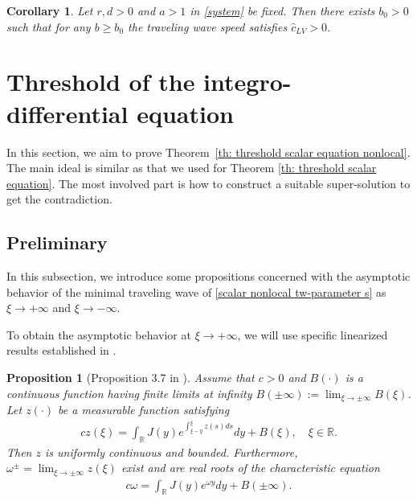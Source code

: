 \documentclass[11pt,a4paper]{article}
\newtheorem{proposition}[theorem]{\textbf{Proposition}}
\newtheorem{corollary}[theorem]{\textbf{Corollary}}
\numberwithin{equation}{section}
\numberwithin{figure}{section}
\newcommand\bea{\begin{eqnarray}}
\newcommand\eea{\end{eqnarray}}
\newcommand\beaa{\begin{eqnarray*}}
\newcommand\eeaa{\end{eqnarray*}}
\begin{document}
\begin{corollary}\label{cor: application 2}
Let $r,d>0$ and $a>1$ in \eqref{system} be fixed. Then there exists $b_0>0$ such that for any $b\ge b_0$ the traveling wave speed satisfies $\hat c_{LV}>0$.
\end{corollary}






\section{Threshold of the integro-differential equation}\label{sec: threshold scalar nonlocal}


In this section, we aim to prove Theorem~\ref{th: threshold scalar equation nonlocal}. The main ideal is similar as that we used for Theorem \ref{th: threshold scalar equation}. The most involved part is how to construct a suitable super-solution to get the contradiction.

\subsection{Preliminary}
In this subsection, we introduce some propositions concerned with the asymptotic behavior of the minimal traveling wave of \eqref{scalar nonlocal tw-parameter s} as $\xi\to+\infty$ and $\xi\to-\infty$.

To obtain the asymptotic behavior at $\xi\to+\infty$, we will use specific linearized results established in \cite{Chen Fu Guo, Zhang_etal2012}.
\begin{proposition}[Proposition 3.7 in \cite{Zhang_etal2012}]\label{prop:Zhang-etal}
Assume that $c>0$ and $B(\cdot)$ is a continuous function having finite limits at infinity $B(\pm \infty):=\lim_{\xi\to\pm\infty}B(\xi)$.
Let $z(\cdot)$ be a measurable function satisfying
\bea\label{eq of z}
c z(\xi)=\int_{\mathbb{R}}J(y)e^{\int_{\xi-y}^{\xi}z(s)ds}dy+B(\xi),\quad \xi\in\mathbb{R}.
\eea
Then $z$ is uniformly continuous and bounded. Furthermore, $\omega^{\pm} = \lim_{\xi\to\pm\infty} z(\xi)$ exist and are real roots of the
characteristic equation
\beaa
c\omega=\int_{\mathbb{R}}J(y)e^{\omega y}dy+B(\pm\infty).
\eeaa
\end{proposition}
\end{document}
